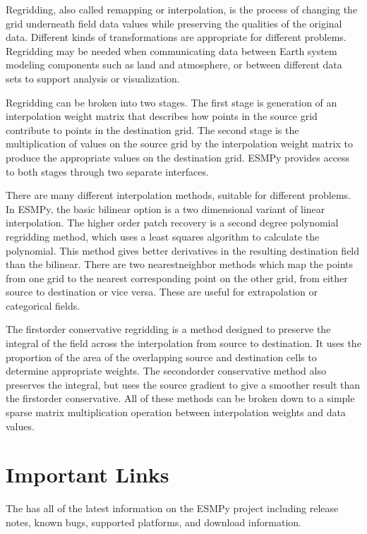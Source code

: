 \documentclass[letterpaper,10pt,english]{sphinxmanual}
\begin{document}
Regridding, also called remapping or interpolation, is the process of changing
the grid underneath field data values while preserving the qualities of the
original data. Different kinds of transformations are appropriate for
different problems. Regridding may be needed when communicating data between
Earth system modeling components such as land and atmosphere, or between
different data sets to support analysis or visualization.

Regridding can be broken into two stages. The first stage is generation of an
interpolation weight matrix that describes how points in the source grid
contribute to points in the destination grid. The second stage is the
multiplication of values on the source grid by the interpolation weight matrix
to produce the appropriate values on the destination grid. ESMPy provides
access to both stages through two separate interfaces.

There are many different interpolation methods, suitable for different problems.
In ESMPy, the basic bilinear option is a two dimensional variant of linear 
interpolation. The higher order patch recovery is a second degree polynomial 
regridding method, which uses a least squares algorithm to calculate the 
polynomial. This method gives better derivatives in the resulting destination 
field than the bilinear. There are two nearest\sphinxhyphen{}neighbor methods which map the 
points from one grid to the nearest corresponding point on the other grid, from
either source to destination or vice versa. These are useful for extrapolation 
or categorical fields.

The first\sphinxhyphen{}order conservative regridding is a method designed to preserve the 
integral of the field across the interpolation from source to destination.  It 
uses the proportion of the area of the overlapping source and destination cells
to determine appropriate weights. The second\sphinxhyphen{}order conservative method also 
preserves the integral, but uses the source gradient to give a smoother result 
than the first\sphinxhyphen{}order conservative. All of these methods can be broken down to a
simple sparse matrix multiplication operation between interpolation weights and
data values.


\chapter{Important Links}
\label{\detokenize{intro:important-links}}
The  has all of the
latest information on the ESMPy project including release notes, known
bugs, supported platforms, and download information.
\end{document}
